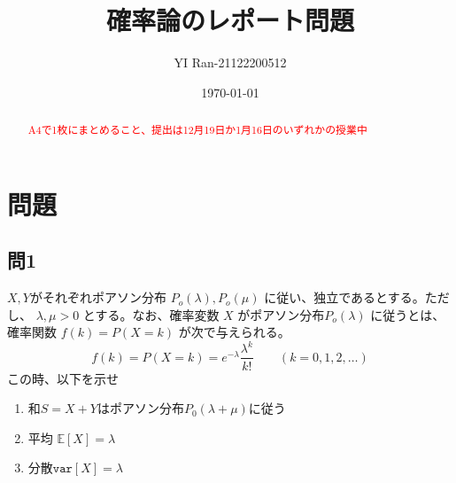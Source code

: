 \documentclass[a4paper]{jsarticle} %
\title{\vspace{-4cm}確率論のレポート問題}
\author{YI Ran-21122200512}
\date{\today}
\begin{document}
\maketitle


\begin{abstract}
  \textcolor{red}{A4で1枚にまとめること、提出は12月19日か1月16日のいずれかの授業中}  
\end{abstract}
\section*{問題}
\subsection*{問1}
$X,Y$がそれぞれポアソン分布 $P_o(\lambda),P_{o}(\mu)$ に従い、独立であるとする。ただし、
 $\lambda ,\mu >0$ とする。なお、確率変数 $X$ がポアソン分布$P_{o}(\lambda)$ に従うとは、確率関数 $f(k)=P(X=k)$ が次で与えられる。
\begin{equation*}
  f(k)=P(X=k)=e^{-\lambda}\dfrac{\lambda^k}{k!}\qquad (k=0,1,2,\dots)
\end{equation*}
この時、以下を示せ
\begin{enumerate}
  \item 和$ S=X+Yはポアソン分布 P_0(\lambda+\mu) $に従う
  \item 平均 $\mathbb{E}[X]=\lambda$
  \item 分散$ \mathtt{var}[X]=\lambda$
\end{enumerate}
\vspace{-0.4cm}
\end{document}
